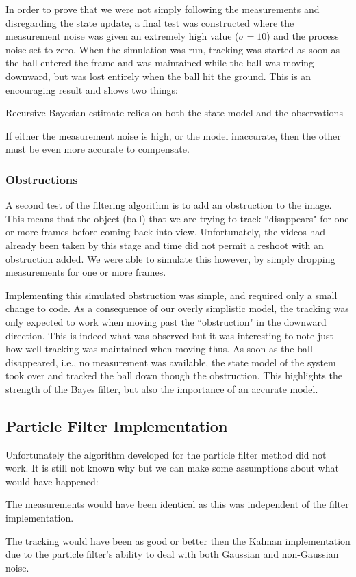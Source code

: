 In order to prove that we were not simply following the measurements and
disregarding the state update, a final test was constructed where the measurement
noise was given an extremely high value ($\sigma = 10$) and the process noise set
to zero. When the simulation was run, tracking was started as
soon as the ball entered the frame and was maintained while the ball was
moving downward, but was lost entirely
when the ball hit the ground. This is an encouraging result and shows two things:
\begin{compactitem}
\item Recursive Bayesian estimate relies on both the state model and the observations
\item If either the measurement noise is high, or the model inaccurate, then the
other must be even more accurate to compensate.
\end{compactitem}


\subsubsection{Obstructions}
A second test of the filtering algorithm is to add an obstruction to the image.
This means that the object (ball) that we are trying to track ``disappears"
for one or more frames before coming back into view. Unfortunately, the videos
had already been taken by this stage and time did not permit a reshoot with
an obstruction added. We were able to simulate this however, by simply dropping
measurements for one or more frames.

Implementing this simulated obstruction was simple, and required only a small
change to code. As a consequence of our overly simplistic model, the
tracking was only expected to work when moving past the ``obstruction" in the
downward direction. This is indeed what was observed but it was interesting to
note just how well tracking was maintained when moving thus.
As soon as the ball disappeared, i.e., no measurement was
available, the state model of the system took over and tracked the ball down
though the obstruction. This highlights the strength of the Bayes filter, but also
the importance of an accurate model.

\subsection{Particle Filter Implementation} %
Unfortunately the algorithm developed for the particle filter method did not work.
It is still not known why but we can make some assumptions about what would
have happened:
\begin{compactitem}
\item The measurements would have been identical as this was independent of the
filter implementation.
\item The tracking would have been as good or better then the Kalman implementation
due to the particle filter's ability to deal with both Gaussian and non-Gaussian
noise.
\end{compactitem}

